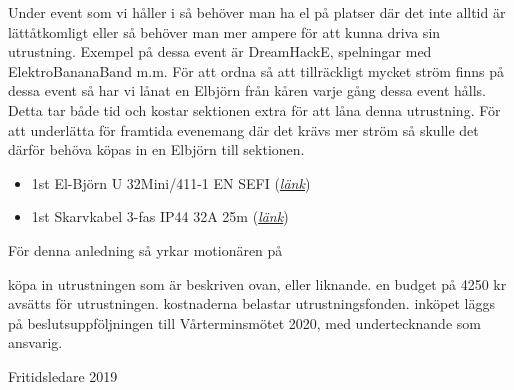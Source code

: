 \documentclass[../_main/handlingar.tex]{subfiles}
\begin{document}

Under event som vi håller i så behöver man ha el på platser där det inte alltid är
lättåtkomligt eller så behöver man mer ampere för att kunna driva sin
utrustning. Exempel på dessa event är DreamHackE, spelningar med
ElektroBananaBand m.m. För att ordna så att tillräckligt mycket ström finns på
dessa event så har vi lånat en Elbjörn från kåren varje gång dessa event hålls.
Detta tar både tid och kostar sektionen extra för att låna denna utrustning. För
att underlätta för framtida evenemang där det krävs mer ström så skulle det
därför behöva köpas in en Elbjörn till sektionen.

\begin{itemize}
            \item 1st El-Björn U 32Mini/411-1 EN SEFI (\href{https://www.proffsmagasinet.se/el-belysning/elfordelning-och-automation/byggcentral/uttagscentral/el-bjorn-u-32mini411-1-en-sefi-uttagscentral?channable=e43496.WUQxMTAxMQ&VAT=1&gclid=EAIaIQobChMI6-fYzs3Q5QIVAuR3Ch3SpwCbEAQYAyABEgISvvD_BwE}{\textit{länk}})
           \item 1st Skarvkabel 3-fas IP44 32A 25m (\href{https://www.elbutik.se/product.html/skarvkabel-3-fas-ip44}{\textit{länk}})
\end{itemize}


För denna anledning så yrkar motionären på

\begin{attsatser}
    \att köpa in utrustningen som är beskriven ovan, eller liknande.
    \att en budget på 4250 kr avsätts för utrustningen.
    \att kostnaderna belastar utrustningsfonden.
    \att inköpet läggs på beslutsuppföljningen till Vårterminsmötet 2020, med undertecknande som ansvarig.
    
\end{attsatser}

\begin{signatures}{1}
    \mvh
    \signature{Vincent Palmer}{Fritidsledare 2019}
\end{signatures}
\end{document}
